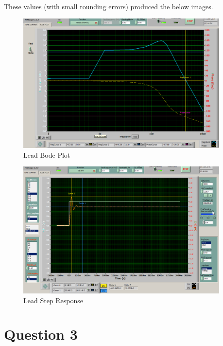 \documentclass{article}
\begin{document}
These values (with small rounding errors) produced the below images.

\begin{figure}[!htbp]
    \centering
    \includegraphics[width=0.95\textwidth]{lead_bode.png}
    \caption{Lead Bode Plot}
\end{figure}

\newpage
\begin{figure}[!htbp]
    \centering
    \includegraphics[width=0.95\textwidth]{lead_step.png}
    \caption{Lead Step Response}
\end{figure}

\newpage
\section{Question 3} %
\label{sec:question_3}
\end{document}
